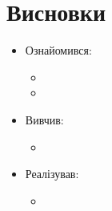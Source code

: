 \section{Висновки}
\begin{itemize}
	\item Ознайомився:
		\begin{itemize}
			\item
			\item
		\end{itemize}
	\item Вивчив:
		\begin{itemize}
			\item
		\end{itemize}
	\item Реалізував:
		\begin{itemize}
			\item
		\end{itemize}
\end{itemize}
